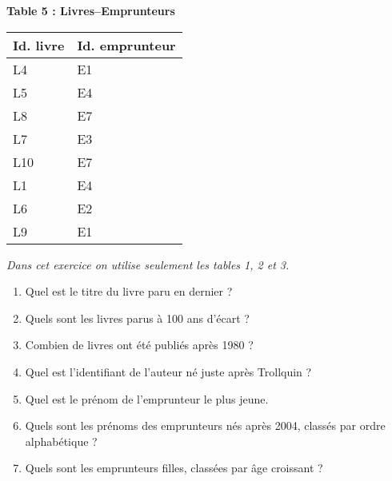 \documentclass[class=report,crop=false, 12pt]{standalone}
\begin{document}
{\begin{minipage}{0.25\textwidth}
\textbf{Table 5 : Livres--Emprunteurs}\\

\begin{tabular}{|l|l|} \hline
\textbf{Id. livre} & \textbf{Id. emprunteur}  \\ \hline\hline
L4 & E1 \\ \hline
L5 & E4 \\ \hline
L8 & E7 \\ \hline
L7 & E3 \\ \hline
L10 & E7 \\ \hline
L1 & E4 \\ \hline
L6 & E2 \\ \hline
L9 & E1 \\ \hline 
\end{tabular}
\end{minipage}
}


\begin{activite}
\emph{Dans cet exercice on utilise seulement les tables 1, 2 et 3.}

\begin{enumerate}
   \item Quel est le titre du livre paru en dernier ?
   \item Quels sont les livres parus à 100 ans d'écart ?
   \item Combien de livres ont été publiés après 1980 ?
   \item Quel est l'identifiant de l'auteur né juste après Trollquin ?   
   \item Quel est le prénom de l'emprunteur le plus jeune.    
   \item Quels sont les prénoms des emprunteurs nés après 2004, classés par ordre alphabétique ?
   \item Quels sont les emprunteurs filles, classées par âge croissant ?
   
\end{enumerate}

\end{activite}
\end{document}
